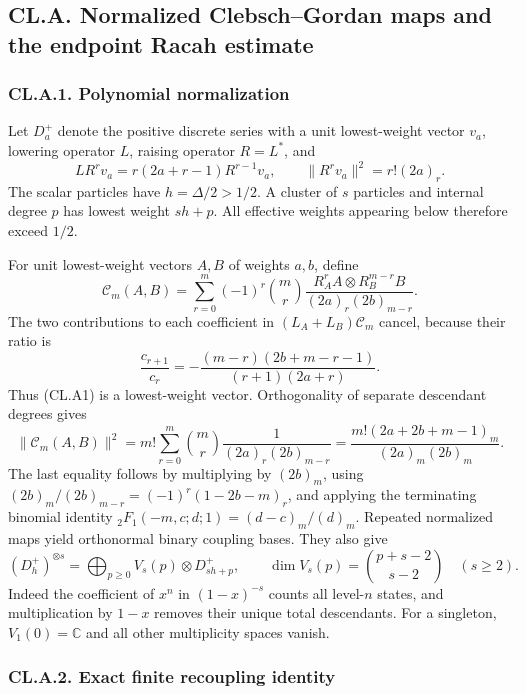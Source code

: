 \hypertarget{cl.a.-normalized-clebschgordan-maps-and-the-endpoint-racah-estimate}{%
\subsection{CL.A. Normalized Clebsch--Gordan maps and the endpoint Racah estimate}\label{cl.a.-normalized-clebschgordan-maps-and-the-endpoint-racah-estimate}}

\hypertarget{cl.a.1.-polynomial-normalization}{%
\subsubsection{CL.A.1. Polynomial normalization}\label{cl.a.1.-polynomial-normalization}}

Let \(D_a^+\) denote the positive discrete series with a unit lowest-weight vector \(v_a\), lowering operator \(L\), raising operator \(R=L^*\), and \[
LR^rv_a=r(2a+r-1)R^{r-1}v_a,\qquad
\|R^rv_a\|^2=r!(2a)_r.
\] The scalar particles have \(h=\Delta/2>1/2\). A cluster of \(s\) particles and internal degree \(p\) has lowest weight \(sh+p\). All effective weights appearing below therefore exceed \(1/2\).

For unit lowest-weight vectors \(A,B\) of weights \(a,b\), define \[
\mathcal C_m(A,B)=
\sum_{r=0}^m(-1)^r\binom mr
\frac{R_A^rA\otimes R_B^{m-r}B}{(2a)_r(2b)_{m-r}}.
\tag{CL.A1}
\] The two contributions to each coefficient in \((L_A+L_B)\mathcal C_m\) cancel, because their ratio is \[
\frac{c_{r+1}}{c_r}
=-\frac{(m-r)(2b+m-r-1)}{(r+1)(2a+r)}.
\] Thus (CL.A1) is a lowest-weight vector. Orthogonality of separate descendant degrees gives \[
\|\mathcal C_m(A,B)\|^2
=m!\sum_{r=0}^m\binom mr\frac1{(2a)_r(2b)_{m-r}}
=\frac{m!(2a+2b+m-1)_m}{(2a)_m(2b)_m}.
\tag{CL.A2}
\] The last equality follows by multiplying by \((2b)_m\), using \((2b)_m/(2b)_{m-r}=(-1)^r(1-2b-m)_r\), and applying the terminating binomial identity \({}_2F_1(-m,c;d;1)=(d-c)_m/(d)_m\). Repeated normalized maps yield orthonormal binary coupling bases. They also give \[
(D_h^+)^{\otimes s}
=\bigoplus_{p\geq0}V_s(p)\otimes D_{sh+p}^+,\qquad
\dim V_s(p)=\binom{p+s-2}{s-2}\quad(s\geq2).
\tag{CL.A3}
\] Indeed the coefficient of \(x^n\) in \((1-x)^{-s}\) counts all level-\(n\) states, and multiplication by \(1-x\) removes their unique total descendants. For a singleton, \(V_1(0)=\mathbb C\) and all other multiplicity spaces vanish.

\hypertarget{cl.a.2.-exact-finite-recoupling-identity}{%
\subsubsection{CL.A.2. Exact finite recoupling identity}\label{cl.a.2.-exact-finite-recoupling-identity}}

